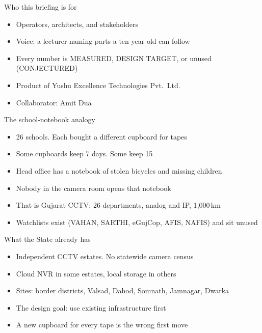 \documentclass[aspectratio=169,11pt]{beamer}
\begin{document}
\titleframecsf


\begin{frame}{Who this briefing is for}
\begin{itemize}\itemsep0.7em
\item Operators, architects, and stakeholders
\item Voice: a lecturer naming parts a ten-year-old can follow
\item Every number is MEASURED, DESIGN TARGET, or unused (CONJECTURED)
\item Product of Yushu Excellence Technologies Pvt.\ Ltd.
\item Collaborator: Amit Dua
\end{itemize}
\end{frame}

\begin{frame}{The school-notebook analogy}
\begin{itemize}\itemsep0.65em
\item 26 schools. Each bought a different cupboard for tapes
\item Some cupboards keep 7 days. Some keep 15
\item Head office has a notebook of stolen bicycles and missing children
\item Nobody in the camera room opens that notebook
\item That is Gujarat CCTV: 26 departments, analog and IP, 1{,}000\,km
\item Watchlists exist (VAHAN, SARTHI, eGujCop, AFIS, NAFIS) and sit unused
\end{itemize}
\end{frame}

\begin{frame}{What the State already has}
\begin{itemize}\itemsep0.65em
\item Independent CCTV estates. No statewide camera census
\item Cloud NVR in some estates, local storage in others
\item Sites: border districts, Valsad, Dahod, Somnath, Jamnagar, Dwarka
\item The design goal: use existing infrastructure first
\item A new cupboard for every tape is the wrong first move
\end{itemize}
\end{frame}
\end{document}
